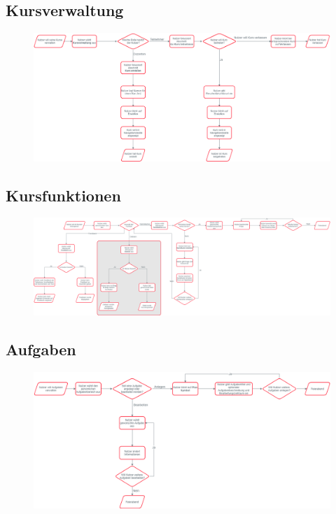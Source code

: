 	\begin{landscape}
		\section{Kursverwaltung}
			\begin{figure}[!h]
				\includegraphics[width=\linewidth, keepaspectratio]{img/Prozesse/coursemanagement}
			\end{figure}
	\end{landscape}

	\begin{landscape}
		\section{Kursfunktionen}
			\begin{figure}[!h]
				\includegraphics[width=\linewidth, keepaspectratio]{img/Prozesse/coursefunction}
			\end{figure}
	\end{landscape}

	\begin{landscape}
		\section{Aufgaben}
			\begin{figure}[!h]
				\includegraphics[width=\linewidth, keepaspectratio]{img/Prozesse/tasks}
			\end{figure}
	\end{landscape}
